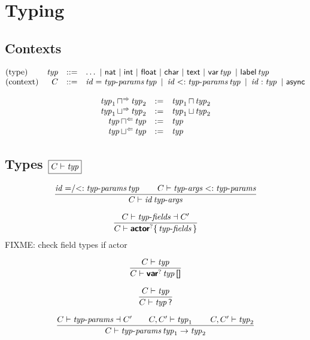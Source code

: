 
\section{Typing}

\subsection*{Contexts}

$$
\begin{array}{@{}lrcl@{}}
\text{(type)} & \x{typ} & ::= &
  \dots ~|~
  \K{nat} ~|~
  \K{int} ~|~
  \K{float} ~|~
  \K{char} ~|~
  \K{text} ~|~
  \K{var} \x{typ} ~|~
  \K{label} \x{typ} \\
\text{(context)} & C & ::= &
  \x{id} = \x{typ-params} \x{typ} ~|~
  \x{id} <: \x{typ-params} \x{typ} ~|~
  \x{id} : \x{typ} ~|~
  \K{async}
\end{array}
$$

$$
\begin{array}{@{}rcl@{}}
\x{typ}_1 \meetsynth \x{typ}_2 &:=& \x{typ}_1 \meet \x{typ}_2 \\
\x{typ}_1 \joinsynth \x{typ}_2 &:=& \x{typ}_1 \join \x{typ}_2 \\
\x{typ} \meetanal \x{typ} &:=& \x{typ} \\
\x{typ} \joinanal \x{typ} &:=& \x{typ} \\
\end{array}
$$

\subsection*{Types \hfill $\boxed{C \vdash \x{typ}}$}

$$
\frac{
  \x{id} \mathrel{{=}/{<:}} \x{typ-params} \x{typ}
  \qquad
  C \vdash \x{typ-args} <: \x{typ-params}
}{
  C \vdash \x{id} \x{typ-args}
}
$$

$$
\frac{
  C \vdash \x{typ-fields} \dashv C'
}{
  C \vdash \KK{actor}^? \K\{ \x{typ-fields} \K\}
}
$$
FIXME: check field types if actor

$$
\frac{
  C \vdash \x{typ}
}{
  C \vdash \KK{var}^? \x{typ} \K{[]}
}
$$

$$
\frac{
  C \vdash \x{typ}
}{
  C \vdash \x{typ} \K?
}
$$

$$
\frac{
  C \vdash \x{typ-params} \dashv C'
  \qquad
  C, C' \vdash \x{typ}_1
  \qquad
  C, C' \vdash \x{typ}_2
}{
  C \vdash \x{typ-params} \x{typ}_1 \Kto \x{typ}_2
}
$$

